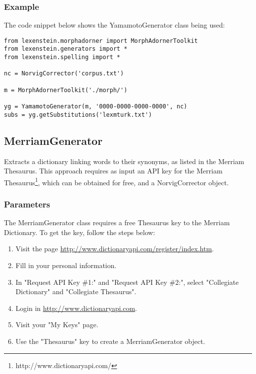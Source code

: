\subsubsection{Example}

The code snippet below shows the YamamotoGenerator class being used:

\begin{lstlisting}
from lexenstein.morphadorner import MorphAdornerToolkit
from lexenstein.generators import *
from lexenstein.spelling import *

nc = NorvigCorrector('corpus.txt')

m = MorphAdornerToolkit('./morph/')

yg = YamamotoGenerator(m, '0000-0000-0000-0000', nc)
subs = yg.getSubstitutions('lexmturk.txt')
\end{lstlisting}













\subsection{MerriamGenerator}

Extracts a dictionary linking words to their synonyms, as listed in the Merriam Thesaurus. This approach requires as input an API key for the Merriam Thesaurus\footnote{http://www.dictionaryapi.com/}, which can be obtained for free, and a NorvigCorrector object.

\subsubsection{Parameters}

The MerriamGenerator class requires a free Thesaurus key to the Merriam Dictionary. To get the key, follow the steps below:

\begin{enumerate}
\item Visit the page \url{http://www.dictionaryapi.com/register/index.htm}.
\item Fill in your personal information.
\item In "Request API Key \#1:" and "Request API Key \#2:", select "Collegiate Dictionary" and "Collegiate Thesaurus".
\item Login in \url{http://www.dictionaryapi.com}.
\item Visit your "My Keys" page.
\item Use the "Thesaurus" key to create a MerriamGenerator object.
\end{enumerate}

